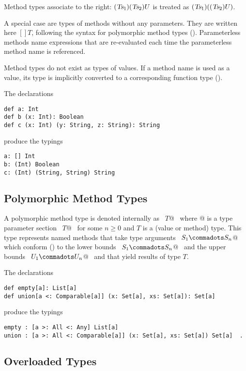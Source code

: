 \documentclass[a4paper,12pt,twoside,titlepage]{book}
\newcommand{\tps}{\mbox{\sl tps}}
\newcommand{\Ts}{\mbox{\sl Ts}}
\begin{document}
Method types associate to the right: $(\Ts_1)(\Ts_2)U$ is treated as
$(\Ts_1)((\Ts_2)U)$.

A special case are types of methods without any parameters. They are
written here $[]T$, following the syntax for polymorphic method types
(). Parameterless methods name expressions that
are re-evaluated each time the parameterless method name is
referenced.

Method types do not exist as types of values. If a method name is used
as a value, its type is implicitly converted to a corresponding
function type ().

\example The declarations
\begin{lstlisting}
def a: Int
def b (x: Int): Boolean
def c (x: Int) (y: String, z: String): String
\end{lstlisting}
produce the typings
\begin{lstlisting}
a: [] Int
b: (Int) Boolean
c: (Int) (String, String) String
\end{lstlisting}

\subsection{Polymorphic Method Types}
\label{sec:poly-types}

A polymorphic method type is denoted internally as ~\lstinline@[$\tps\,$]$T$@~ where
\lstinline@[$\tps\,$]@ is a type parameter section 
~\lstinline@[$a_1$ <: $L_1$ >: $U_1 \commadots a_n$ <: $L_n$ >: $U_n$] $T$@~ 
for some $n \geq 0$ and $T$ is a
(value or method) type.  This type represents named methods that
take type arguments ~\lstinline@$S_1 \commadots S_n$@~ which
conform () to the lower bounds
~\lstinline@$S_1 \commadots S_n$@~ and the upper bounds
~\lstinline@$U_1 \commadots U_n$@~ and that yield results of type $T$.

\example The declarations
\begin{lstlisting}
def empty[a]: List[a]
def union[a <: Comparable[a]] (x: Set[a], xs: Set[a]): Set[a]
\end{lstlisting}
produce the typings
\begin{lstlisting}
empty : [a >: All <: Any] List[a]
union : [a >: All <: Comparable[a]] (x: Set[a], xs: Set[a]) Set[a]  .
\end{lstlisting}

\subsection{Overloaded Types}
\label{sec:overloaded-types}
\newcommand{\overload}{\la\mbox{\sf and}\ra}
\end{document}
